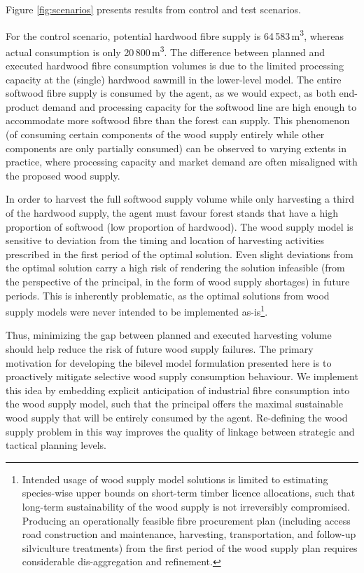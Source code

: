 Figure \ref{fig:scenarios} presents results from control and test scenarios.
 
For the control scenario, potential hardwood fibre supply is 64\,583\,\si{\cubic\metre}, whereas actual consumption is only 20\,800\,\si{\cubic\metre}.
The difference between planned and executed hardwood fibre consumption volumes is due to the limited processing capacity at the (single) hardwood sawmill in the lower-level model.
The entire softwood fibre supply is consumed by the agent, as we would expect, as both end-product demand and processing capacity for the softwood line are high enough to accommodate more softwood fibre than the forest can supply. 
This phenomenon (of consuming certain components of the wood supply entirely while other components are only partially consumed) can be observed to varying extents in practice, where processing capacity and market demand are often misaligned with the proposed wood supply.

In order to harvest the full softwood supply volume while only harvesting a third of the hardwood supply, the agent must favour forest stands that have a high proportion of softwood (low proportion of hardwood).
The wood supply model is sensitive to deviation from the timing and location of harvesting activities prescribed in the first period of the optimal solution.
Even slight deviations from the optimal solution carry a high risk of rendering the solution infeasible (from the perspective of the principal, in the form of wood supply shortages) in future periods.   
This is inherently problematic, as the optimal solutions from wood supply models were never intended to be implemented as-is\footnote{Intended usage of wood supply model solutions is limited to estimating species-wise upper bounds on short-term timber licence allocations, such that long-term sustainability of the wood supply is not irreversibly compromised.
Producing an operationally feasible fibre procurement plan (including access road construction and maintenance, harvesting, transportation, and follow-up silviculture treatments) from the first period of the wood supply plan requires considerable dis-aggregation and refinement.}.


Thus, minimizing the gap between planned and executed harvesting volume should help reduce the risk of future wood supply failures.
The primary motivation for developing the bilevel model formulation presented here is to proactively mitigate selective wood supply consumption behaviour. 
We implement this idea by embedding explicit anticipation of industrial fibre consumption into the wood supply model, such that the principal offers the maximal sustainable wood supply that will be entirely consumed by the agent. 
Re-defining the wood supply problem in this way improves the quality of linkage between strategic and tactical planning levels.

